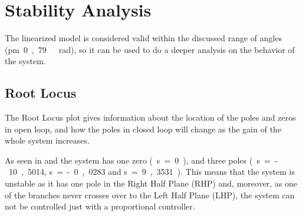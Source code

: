 \section{Stability Analysis}\label{sec:stabilityAnalysis}
The linearized model is considered valid within the discussed range of angles (\si{\pm 0,79\ rad}), so it can be used to do a deeper analysis on the behavior of the system. %

%
%
%

\subsection{Root Locus}
The Root Locus plot gives information about the location of the poles and zeros in open loop, and how the poles in closed loop will change as the gain of the whole system increases.

As seen in  and  the system has one zero \si{(s=0)}, and three poles \si{(s=-10,5014}, \si{s=-0,0283} and \si{s=9,3531)}. This means that the system is unstable as it has one pole in the Right Half Plane (RHP) and, moreover, as one of the branches never crosses over to the Left Half Plane (LHP), the system can not be controlled just with a proportional controller.

